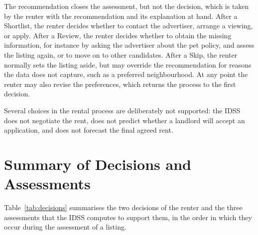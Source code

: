 \documentclass[12pt,a4paper]{report}
\begin{document}
The recommendation closes the assessment, but not the decision, which is
taken by the renter with the recommendation and its explanation at hand.
After a Shortlist, the renter decides whether to contact the advertiser, arrange a
viewing, or apply. After a Review, the renter decides whether to obtain the
missing information, for instance by asking the advertiser about the pet
policy, and assess the listing again, or to move on to other candidates.
After a Skip, the renter normally sets the listing aside, but may override
the recommendation for reasons the data does not capture, such as a
preferred neighbourhood. At any point the renter may also revise the
preferences, which returns the process to the first decision.

Several choices in the rental process are deliberately not supported:
the IDSS does not negotiate the rent, does not predict whether a landlord
will accept an application, and does not forecast the final agreed rent.

\section{Summary of Decisions and Assessments}

Table~\ref{tab:decisions} summarises the two decisions of the renter and
the three assessments that the IDSS computes to support them, in the order
in which they occur during the assessment of a listing.
\end{document}
